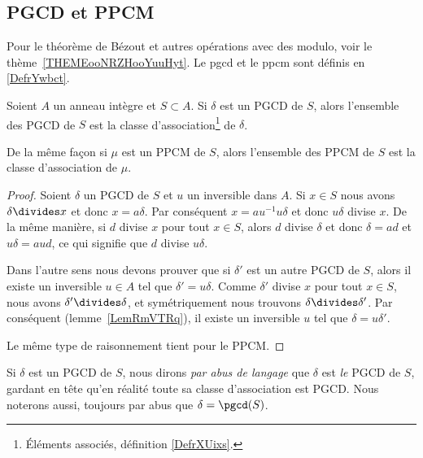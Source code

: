 \subsection{PGCD et PPCM}

Pour le théorème de Bézout et autres opérations avec des modulo, voir le thème~\ref{THEMEooNRZHooYuuHyt}. Le pgcd et le ppcm sont définis en \ref{DefrYwbct}.

\begin{lemma}		\label{LEMooGWKMooLEepxz}
	Soient \( A\) un anneau intègre et \( S\subset A\). Si \( \delta\) est un PGCD de \( S\), alors l'ensemble des PGCD de \( S\) est la classe d'association\footnote{Éléments associés, définition \ref{DefrXUixs}.} de \( \delta\).

	De la même façon si \( \mu\) est un PPCM de \( S\), alors l'ensemble des PPCM de \( S\) est la classe d'association de \( \mu\).
\end{lemma}

\begin{proof}
	Soient \( \delta\) un PGCD de \( S\) et \( u\) un inversible dans \( A\). Si \( x\in S\) nous avons \( \delta\divides x\) et donc \( x=a\delta\). Par conséquent \( x=au^{-1}u\delta\) et donc \( u\delta\) divise \( x\). De la même manière, si \( d\) divise \( x\) pour tout \( x\in S\), alors \( d\) divise \( \delta\) et donc \( \delta=ad\) et \( u\delta=aud\), ce qui signifie que \( d\) divise \( u\delta\).

	Dans l'autre sens nous devons prouver que si \( \delta'\) est un autre PGCD de \( S\), alors il existe un inversible \( u\in A\) tel que \( \delta'=u\delta\). Comme \( \delta'\) divise \( x\) pour tout \( x\in S\), nous avons \( \delta'\divides \delta\), et symétriquement nous trouvons \( \delta\divides\delta'\). Par conséquent (lemme~\ref{LemRmVTRq}), il existe un inversible \( u\) tel que \( \delta=u\delta'\).

	Le même type de raisonnement tient pour le PPCM.
\end{proof}

Si \( \delta\) est un PGCD de \( S\), nous dirons \emph{par abus de langage} que \( \delta\) est \emph{le} PGCD de \( S\), gardant en tête qu'en réalité toute sa classe d'association est PGCD. Nous noterons aussi, toujours par abus que \( \delta=\pgcd(S)\).

